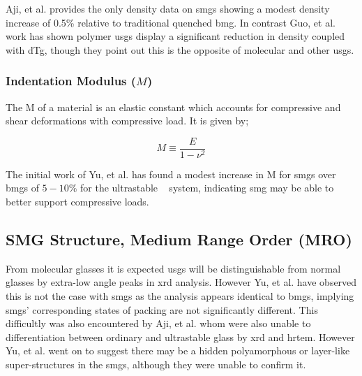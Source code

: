 \documentclass[a4paper,12pt,oneside]{report}%
\begin{document}
Aji, et al. \cite{Aji2013} provides the only density data on \glspl{smg} showing a modest density increase of 0.5\% relative to traditional quenched \gls{bmg}. In contrast Guo, et al. \cite{Guo2012} work has shown polymer \glspl{usg} display a significant reduction in density coupled with \gls{dTg}, though they point out this is the opposite of molecular and other \glspl{usg}. 

\subsubsection{Indentation Modulus ($M$)}
The \gls{M} of a material is an elastic constant which accounts for compressive and shear deformations with compressive load. It is given by;

\begin{equation}
M \equiv 
\frac{E}
{1-\nu^{2}}
\label{equ:IndentModulus}
\end{equation}

The initial work of Yu, et al. \cite{Yu2013} has found a modest increase in \gls{M} for \glspl{smg} over \glspl{bmg} of $5- 10\%$ for the ultrastable \ZrCuAl~ system, indicating \gls{smg} may be able to better support compressive loads. 

\subsection{SMG Structure, Medium Range Order (MRO)} 
From molecular glasses it is expected \glspl{usg} will be distinguishable from normal glasses by extra-low angle peaks in \gls{xrd} analysis. However Yu, et al. \cite{Yu2013} have observed this is not the case with \glspl{smg} as the analysis appears identical to \glspl{bmg}, implying \glspl{smg}' corresponding states of packing are not significantly different. This difficultly was also encountered by Aji, et al. \cite{Aji2013} whom were also unable to differentiation between ordinary and ultrastable glass by \gls{xrd} and \gls{hrtem}. However Yu, et al. \cite{Yu2013} went on to suggest there may be a hidden polyamorphous or layer-like super-structures in the \glspl{smg}, although they were unable to confirm it. 
\end{document}
